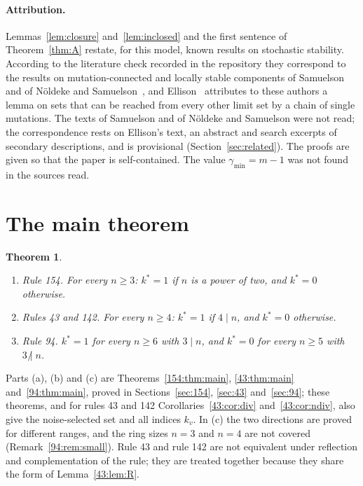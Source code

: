 \documentclass[10pt,a4paper]{article}
\newtheorem{theorem}{Theorem}[section]
\newcommand{\gmin}{\gamma_{\min}}
\newcommand{\kst}{k^{*}}
\newcommand{\ndiv}{\mathrel{\not|}}           %
\begin{document}
\paragraph{Attribution.}
Lemmas~\ref{lem:closure} and~\ref{lem:inclosed} and the first sentence of Theorem~\ref{thm:A} restate, for this
model, known results on stochastic stability. According to the literature check recorded in the repository they
correspond to the results on mutation-connected and locally stable components of Samuelson~\cite{Samuelson1994}
and of N\"oldeke and Samuelson~\cite[Proposition~1]{NoldekeSamuelson1993}, and
Ellison~\cite[Section~6.2, pp.~37--38]{Ellison2000} attributes to these authors a lemma on sets that can be reached
from every other limit set by a chain of single mutations. The texts of Samuelson and of N\"oldeke and Samuelson
were not read; the correspondence rests on Ellison's text, an abstract and search excerpts of secondary
descriptions, and is provisional (Section~\ref{sec:related}). The proofs are given so that the paper is self-contained. The value $\gmin=m-1$ was
not found in the sources read.

\section{The main theorem}\label{sec:main}

\begin{theorem}\label{thm:main}
\begin{enumerate}[label=\textup{(\alph*)},nosep,leftmargin=2.2em]
\item \emph{Rule 154.} For every $n\ge3$: $\kst=1$ if $n$ is a power of two, and $\kst=0$ otherwise.
\item \emph{Rules 43 and 142.} For every $n\ge4$: $\kst=1$ if $4\mid n$, and $\kst=0$ otherwise.
\item \emph{Rule 94.} $\kst=1$ for every $n\ge6$ with $3\mid n$, and $\kst=0$ for every $n\ge5$ with $3\ndiv n$.
\end{enumerate}
\end{theorem}

Parts (a), (b) and (c) are Theorems~\ref{154:thm:main}, \ref{43:thm:main} and~\ref{94:thm:main}, proved in
Sections~\ref{sec:154}, \ref{sec:43} and~\ref{sec:94}; these theorems, and for rules 43 and 142
Corollaries~\ref{43:cor:div} and~\ref{43:cor:ndiv}, also give the noise-selected set and all indices $k_v$. In (c) the two directions are proved for different ranges, and the ring sizes $n=3$ and $n=4$ are not
covered (Remark~\ref{94:rem:small}). Rule 43 and rule 142 are not equivalent under reflection and complementation of
the rule; they are treated together because they share the form of Lemma~\ref{43:lem:R}.
\end{document}
